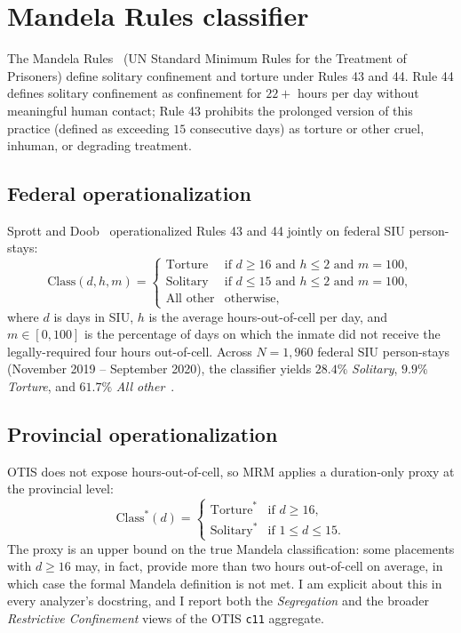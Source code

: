 \documentclass[11pt,a4paper]{article}
\theoremstyle{plain}
\theoremstyle{definition}
\theoremstyle{remark}
\begin{document}
\section{Mandela Rules classifier}
\label{sec:mandela}

The Mandela Rules~\cite{UN2015Mandela} (UN Standard Minimum Rules
for the Treatment of Prisoners) define solitary confinement and
torture under Rules 43 and 44. Rule 44 defines solitary
confinement as confinement for $22+$ hours per day without
meaningful human contact; Rule 43 prohibits the prolonged version
of this practice (defined as exceeding $15$ consecutive days) as
torture or other cruel, inhuman, or degrading treatment.

\subsection{Federal operationalization}

Sprott and Doob~\cite{SprottDoob2021Torture} operationalized
Rules 43 and 44 jointly on federal SIU person-stays:
\begin{equation}
  \mathrm{Class}(d, h, m)
  =
  \begin{cases}
    \text{Torture}    & \text{if } d \ge 16 \text{ and }
                              h \le 2 \text{ and } m = 100,\\
    \text{Solitary}   & \text{if } d \le 15 \text{ and }
                              h \le 2 \text{ and } m = 100,\\
    \text{All other}  & \text{otherwise},
  \end{cases}
  \label{eq:mandela-class}
\end{equation}
where $d$ is days in SIU, $h$ is the average hours-out-of-cell
per day, and $m \in [0,100]$ is the percentage of days on which
the inmate did not receive the legally-required four hours
out-of-cell. Across $N = 1{,}960$ federal SIU person-stays
(November 2019 -- September 2020), the classifier yields
$28.4\%$ \emph{Solitary}, $9.9\%$ \emph{Torture}, and $61.7\%$
\emph{All other}~\cite{SprottDoob2021Torture}.

\subsection{Provincial operationalization}

OTIS does not expose hours-out-of-cell, so MRM applies a
duration-only proxy at the provincial level:
\begin{equation}
  \mathrm{Class}^{\ast}(d) =
  \begin{cases}
    \text{Torture}^{\ast}  & \text{if } d \ge 16,\\
    \text{Solitary}^{\ast} & \text{if } 1 \le d \le 15.
  \end{cases}
  \label{eq:mandela-prov}
\end{equation}
The proxy is an upper bound on the true Mandela classification:
some placements with $d \ge 16$ may, in fact, provide more than
two hours out-of-cell on average, in which case the formal
Mandela definition is not met. I am explicit about this in
every analyzer's docstring, and I report both the
\emph{Segregation} and the broader \emph{Restrictive Confinement}
views of the OTIS \texttt{c11} aggregate.
\end{document}

